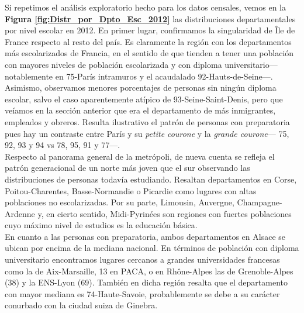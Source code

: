 Si repetimos el análisis exploratorio hecho para los datos censales, vemos en la \textbf{Figura \ref{fig:Distr_por_Dpto_Esc_2012}} las distribuciones departamentales por nivel escolar en 2012. En primer lugar, confirmamos la singularidad de Île de France respecto al resto del país. Es claramente la región con los departamentos más escolarizados de Francia, en el sentido de que tienden a tener una población con mayores niveles de población escolarizada y con diploma universitario--- notablemente en 75-París intramuros y el acaudalado 92-Hauts-de-Seine---. Asimismo, observamos menores porcentajes de personas sin ningún diploma escolar, salvo el caso aparentemente atípico de 93-Seine-Saint-Denis, pero que veíamos en la sección anterior que era el departamento de más inmigrantes, empleados y obreros. Resulta ilustrativo el patrón de personas con preparatoria pues hay un contraste entre París y su \textit{petite courone} y la \textit{grande courone}--- 75, 92, 93 y 94 vs 78, 95, 91 y 77---.\\ 

 Respecto al panorama general de la metrópoli, de nueva cuenta se refleja el patrón generacional de un norte más joven que el sur observando las distribuciones de personas todavía estudiando. Resaltan departamentos en Corse, Poitou-Charentes, Basse-Normandie o Picardie como lugares con altas poblaciones no escolarizadas. Por su parte, Limousin, Auvergne, Champagne-Ardenne y, en cierto sentido, Midi-Pyrinées son regiones con fuertes poblaciones cuyo máximo nivel de estudios es la educación básica.\\ 
 
 En cuanto a las personas con preparatoria, ambos departamentos en Alsace se ubican por encima de la mediana nacional. En términos de población con diploma universitario encontramos lugares cercanos a grandes universidades francesas como la de Aix-Marsaille, 13 en PACA, o en Rhône-Alpes las de Grenoble-Alpes (38) y la ENS-Lyon (69). También en dicha región resalta que el departamento con mayor mediana es 74-Haute-Savoie, probablemente se debe a su carácter conurbado con la ciudad suiza de Ginebra.\\
 

